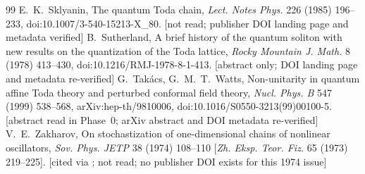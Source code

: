 \documentclass[11pt,a4paper]{article}
\theoremstyle{remark}
\begin{document}
\begin{thebibliography}{99}
 E.~K.~Sklyanin, The quantum Toda chain, \emph{Lect. Notes Phys.} 226 (1985) 196--233, doi:10.1007/3-540-15213-X\_80. [not read; publisher DOI landing page and metadata verified]
 B.~Sutherland, A brief history of the quantum soliton with new results on the quantization of the Toda lattice, \emph{Rocky Mountain J. Math.} 8 (1978) 413--430, doi:10.1216/RMJ-1978-8-1-413. [abstract only; DOI landing page and metadata re-verified]
 G.~Tak\'acs, G.~M.~T.~Watts, Non-unitarity in quantum affine Toda theory and perturbed conformal field theory, \emph{Nucl. Phys. B} 547 (1999) 538--568, arXiv:hep-th/9810006, doi:10.1016/S0550-3213(99)00100-5. [abstract read in Phase~0; arXiv abstract and DOI metadata re-verified]
 V.~E.~Zakharov, On stochastization of one-dimensional chains of nonlinear oscillators, \emph{Sov. Phys. JETP} 38 (1974) 108--110 [\emph{Zh. Eksp. Teor. Fiz.} 65 (1973) 219--225]. [cited via \cite{CL-WW,BD}; not read; no publisher DOI exists for this 1974 issue]
\end{thebibliography}

\end{document}
